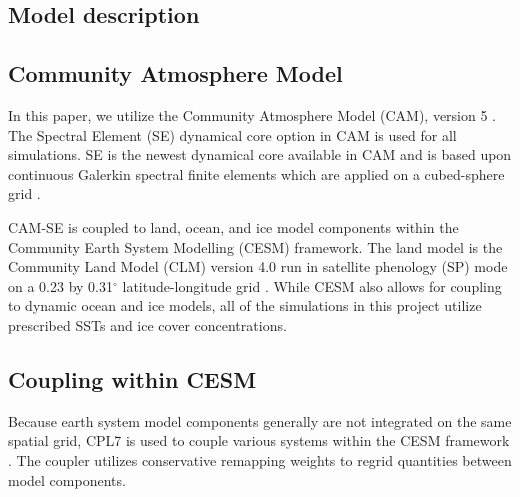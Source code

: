 \documentclass[draft,ms]{AGUTeX}
\begin{document}
\begin{article}

\section{Model description}
\label{sec:model}

\subsection{Community Atmosphere Model}
\label{subsec:cam}

In this paper, we utilize the Community Atmosphere Model (CAM), version 5 \citep{CAM5Tech}. The Spectral Element (SE) dynamical core option in CAM is used for all simulations. SE is the newest dynamical core available in CAM and is based upon continuous Galerkin spectral finite elements which are applied on a cubed-sphere grid \citep{Taylor1997,Thomas2005,Taylor2010,Dennis2012}. 


CAM-SE is coupled to land, ocean, and ice model components within the Community Earth System Modelling (CESM) framework. The land model is the Community Land Model (CLM) version 4.0 run in satellite phenology (SP) mode on a 0.23 by 0.31$^{\circ}$ latitude-longitude grid \citep{CLM40Tech}. While CESM also allows for coupling to dynamic ocean and ice models, all of the simulations in this project utilize prescribed SSTs and ice cover concentrations.

\subsection{Coupling within CESM}
\label{subsec:coupling}

Because earth system model components generally are not integrated on the same spatial grid, CPL7 is used to couple various systems within the CESM framework \citep{Craig2012}. The coupler utilizes conservative remapping weights to regrid quantities between model components.


\end{article}
\end{document}
